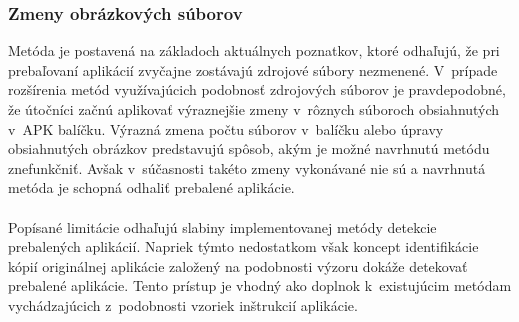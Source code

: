 \subsubsection{\textbf{Zmeny obrázkových súborov}}
Metóda je postavená na základoch aktuálnych poznatkov, ktoré odhaľujú, že pri prebaľovaní aplikácií zvyčajne zostávajú zdrojové súbory nezmenené. V~prípade rozšírenia metód využívajúcich podobnosť zdrojových súborov je pravdepodobné, že útočníci začnú aplikovať výraznejšie zmeny v~rôznych súboroch obsiahnutých v~APK balíčku. Výrazná zmena počtu súborov v~balíčku alebo úpravy obsiahnutých obrázkov predstavujú spôsob, akým je možné navrhnutú metódu znefunkčniť. Avšak v~súčasnosti takéto zmeny vykonávané nie sú a navrhnutá metóda je schopná odhaliť prebalené aplikácie.
\\
\\
Popísané limitácie odhaľujú slabiny implementovanej metódy detekcie prebalených aplikácií. Napriek týmto nedostatkom však koncept identifikácie kópií originálnej aplikácie založený na podobnosti výzoru dokáže detekovať prebalené aplikácie. Tento prístup je vhodný ako doplnok k~existujúcim metódam vychádzajúcich z~podobnosti vzoriek inštrukcií aplikácie.


